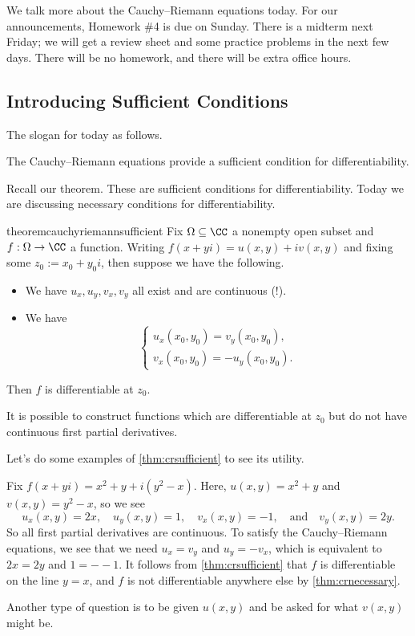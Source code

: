 
We talk more about the Cauchy--Riemann equations today. For our announcements, Homework \#4 is due on Sunday. There is a midterm next Friday; we will get a review sheet and some practice problems in the next few days. There will be no homework, and there will be extra office hours.

\subsection{Introducing Sufficient Conditions}

The slogan for today as follows.
\begin{idea}
	The Cauchy--Riemann equations provide a sufficient condition for differentiability.
\end{idea}
Recall our theorem.
\cauchyriemannnecessary*
\noindent These are sufficient conditions for differentiability. Today we are discussing necessary conditions for differentiability.
\begin{restatable}{theorem}{cauchyriemannsufficient} \label{thm:crsufficient}
	Fix $\Omega\subseteq\CC$ a nonempty open subset and $f:\Omega\to\CC$ a function. Writing $f(x+yi)=u(x,y)+iv(x,y)$ and fixing some $z_0:=x_0+y_0i$, then suppose we have the following.
	\begin{itemize}
		\item We have $u_x,u_y,v_x,v_y$ all exist and are continuous (!).
		\item We have
		\[\begin{cases}
			u_x(x_0,y_0)=v_y(x_0,y_0), \\
			v_x(x_0,y_0)=-u_y(x_0,y_0).
		\end{cases}\]
	\end{itemize}
	Then $f$ is differentiable at $z_0$.
\end{restatable}
\begin{remark}
	It is possible to construct functions which are differentiable at $z_0$ but do not have continuous first partial derivatives.
\end{remark}
Let's do some examples of \autoref{thm:crsufficient} to see its utility.
\begin{example}
	Fix $f(x+yi)=x^2+y+i\left(y^2-x\right)$. Here, $u(x,y)=x^2+y$ and $v(x,y)=y^2-x$, so we see
	\[u_x(x,y)=2x,\quad u_y(x,y)=1,\quad v_x(x,y)=-1,\quad\text{and}\quad v_y(x,y)=2y.\]
	So all first partial derivatives are continuous. To satisfy the Cauchy--Riemann equations, we see that we need $u_x=v_y$ and $u_y=-v_x$, which is equivalent to $2x=2y$ and $1=--1$. It follows from \autoref{thm:crsufficient} that $f$ is differentiable on the line $y=x$, and $f$ is not differentiable anywhere else by \autoref{thm:crnecessary}.
\end{example}
\begin{remark}
	Another type of question is to be given $u(x,y)$ and be asked for what $v(x,y)$ might be.
\end{remark}

